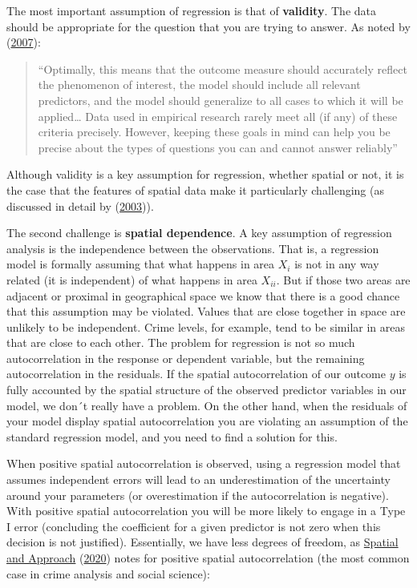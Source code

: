 \documentclass[
  krantz2]{krantz}
\begin{document}
The most important assumption of regression is that of \textbf{validity}. The data should be appropriate for the question that you are trying to answer. As noted by (\protect\hyperlink{ref-Gelman_2007}{2007}):

\begin{quote}
``Optimally, this means that the outcome measure should accurately reflect the phenomenon of interest, the model should include all relevant predictors, and the model should generalize to all cases to which it will be applied\ldots{} Data used in empirical research rarely meet all (if any) of these criteria precisely. However, keeping these goals in mind can help you be precise about the types of questions you can and cannot answer reliably''
\end{quote}

Although validity is a key assumption for regression, whether spatial or not, it is the case that the features of spatial data make it particularly challenging (as discussed in detail by (\protect\hyperlink{ref-Haining_2003}{2003})).

The second challenge is \textbf{spatial dependence}. A key assumption of regression analysis is the independence between the observations. That is, a regression model is formally assuming that what happens in area \(X_i\) is not in any way related (it is independent) of what happens in area \(X_{ii}\). But if those two areas are adjacent or proximal in geographical space we know that there is a good chance that this assumption may be violated. Values that are close together in space are unlikely to be independent. Crime levels, for example, tend to be similar in areas that are close to each other. The problem for regression is not so much autocorrelation in the response or dependent variable, but the remaining autocorrelation in the residuals. If the spatial autocorrelation of our outcome \(y\) is fully accounted by the spatial structure of the observed predictor variables in our model, we don´t really have a problem. On the other hand, when the residuals of your model display spatial autocorrelation you are violating an assumption of the standard regression model, and you need to find a solution for this.

When positive spatial autocorrelation is observed, using a regression model that assumes independent errors will lead to an underestimation of the uncertainty around your parameters (or overestimation if the autocorrelation is negative). With positive spatial autocorrelation you will be more likely to engage in a Type I error (concluding the coefficient for a given predictor is not zero when this decision is not justified). Essentially, we have less degrees of freedom, as \protect\hyperlink{ref-Haining_2020}{Spatial and Approach} (\protect\hyperlink{ref-Haining_2020}{2020}) notes for positive spatial autocorrelation (the most common case in crime analysis and social science):
\end{document}
